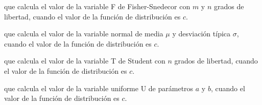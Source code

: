 \begin{description}[leftmargin=*]
\item[IDF.F $(c,m,n)$] que calcula el valor de la variable F de
Fisher-Snedecor con $m$ y $n$ grados de libertad, cuando el valor
de la función de distribución es $c$.

\item[IDF.NORMAL $(c,\mu,\sigma)$] que calcula el valor de la
variable normal de media $\mu$ y desviación típica $\sigma$,
cuando el valor de la función de distribución es $c$.

\item[IDF.T $(c,n)$] que calcula el valor de la variable T de
Student con $n$ grados de libertad, cuando el valor de la función
de distribución es $c$.

\item[IDF.UNIFORM $(c,a,b)$] que calcula el valor de la variable
uniforme U de parámetros $a$ y $b$, cuando el valor de la función
de distribución es $c$.
\end{description}


